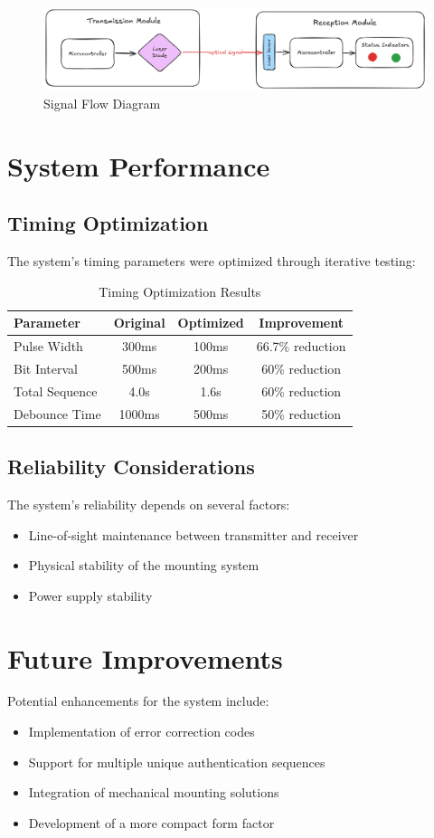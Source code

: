 \documentclass[12pt,a4paper]{article}
\begin{document}
\begin{figure}[h]
    \centering
    \includegraphics[width=0.8\linewidth]{flow_diagram.png}
    \caption{Signal Flow Diagram}
\end{figure}

\section{System Performance}
\subsection{Timing Optimization}
The system's timing parameters were optimized through iterative testing:

\begin{table}[h]
    \centering
    \begin{tabular}{lccc}
        \toprule
        Parameter & Original & Optimized & Improvement \\
        \midrule
        Pulse Width & 300ms & 100ms & 66.7\% reduction \\
        Bit Interval & 500ms & 200ms & 60\% reduction \\
        Total Sequence & 4.0s & 1.6s & 60\% reduction \\
        Debounce Time & 1000ms & 500ms & 50\% reduction \\
        \bottomrule
    \end{tabular}
    \caption{Timing Optimization Results}
\end{table}

\subsection{Reliability Considerations}
The system's reliability depends on several factors:
\begin{itemize}
    \item Line-of-sight maintenance between transmitter and receiver
    \item Physical stability of the mounting system
    \item Power supply stability
\end{itemize}

\section{Future Improvements}
Potential enhancements for the system include:
\begin{itemize}
    \item Implementation of error correction codes
    \item Support for multiple unique authentication sequences
    \item Integration of mechanical mounting solutions
    \item Development of a more compact form factor
\end{itemize}
\end{document}
